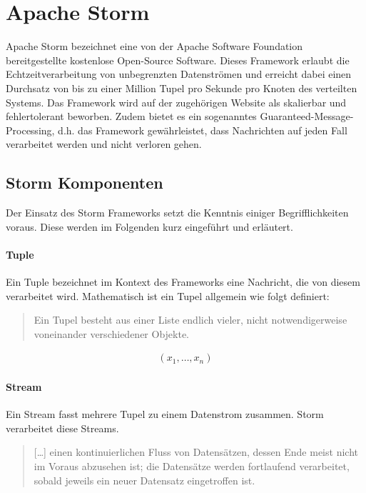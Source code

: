 \documentclass[a4paper,11pt]{scrartcl}
\begin{document}

  \section{Apache Storm}

  Apache Storm bezeichnet eine von der Apache Software Foundation
  bereitgestellte kostenlose Open-Source Software. Dieses Framework
  erlaubt die Echtzeitverarbeitung von unbegrenzten Datenströmen und
  erreicht dabei einen Durchsatz von bis zu einer Million Tupel pro
  Sekunde pro Knoten des verteilten Systems. Das Framework wird auf
  der zugehörigen Website als skalierbar und fehlertolerant beworben.
  Zudem bietet es ein sogenanntes Guaranteed-Message-Processing, d.h.
  das Framework gewährleistet, dass Nachrichten auf jeden Fall
  verarbeitet werden und nicht verloren gehen.\cite{apachestorm}

  \subsection{Storm Komponenten}

  Der Einsatz des Storm Frameworks setzt die Kenntnis einiger
  Begrifflichkeiten voraus. Diese werden im Folgenden kurz eingeführt
  und erläutert.\cite[S.~53ff.]{stormpresentation2011}

  \paragraph{Tuple}
  Ein Tuple bezeichnet im Kontext des Frameworks eine Nachricht, die
  von diesem verarbeitet wird. Mathematisch ist ein Tupel allgemein wie folgt
  definiert:
  \begin{quote}
    Ein Tupel besteht aus einer Liste endlich vieler, nicht
    notwendigerweise voneinander verschiedener Objekte.
  \end{quote}

  \begin{align*}
    (x_1, \ldots , x_n)
  \end{align*}

  \paragraph{Stream}
  Ein Stream fasst mehrere Tupel zu einem Datenstrom zusammen. Storm
  verarbeitet diese Streams.
  \begin{quote}
    [\ldots] einen kontinuierlichen Fluss von Datensätzen, dessen Ende
    meist nicht im Voraus abzusehen ist; die Datensätze werden
    fortlaufend verarbeitet, sobald jeweils ein neuer Datensatz
    eingetroffen ist.
  \end{quote}
\end{document}
